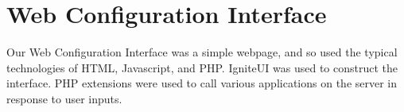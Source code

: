 \section{Web Configuration Interface}

Our Web Configuration Interface was a simple webpage, and so used the typical technologies of HTML, Javascript, and PHP.  IgniteUI was used to construct the interface.  PHP extensions were used to call various applications on the server in response to user inputs.